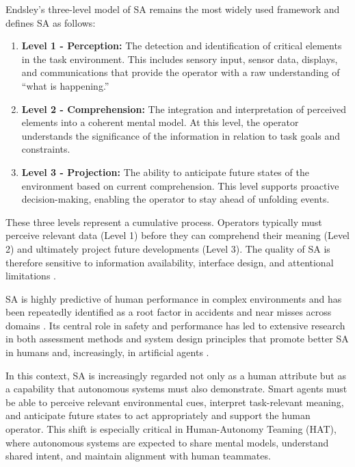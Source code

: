 \documentclass[12pt,a4paper]{article} %
\begin{document}
	Endsley's three-level model of SA \parencite{endsley_measurement_1995} remains the most widely used framework and defines SA as follows:
	\begin{enumerate}
		\item \textbf{Level 1 - Perception:} The detection and identification of critical elements in the task environment. This includes sensory input, sensor data, displays, and communications that provide the operator with a raw understanding of “what is happening.”
		
		\item \textbf{Level 2 - Comprehension:} The integration and interpretation of perceived elements into a coherent mental model. At this level, the operator understands the significance of the information in relation to task goals and constraints.
		
		\item \textbf{Level 3 - Projection:} The ability to anticipate future states of the environment based on current comprehension. This level supports proactive decision-making, enabling the operator to stay ahead of unfolding events.
	\end{enumerate}

	These three levels represent a cumulative process. Operators typically must perceive relevant data (Level 1) before they can comprehend their meaning (Level 2) and ultimately project future developments (Level 3). The quality of SA is therefore sensitive to information availability, interface design, and attentional limitations \parencite{endsley-2015}.

	SA is highly predictive of human performance in complex environments and has been repeatedly identified as a root factor in accidents and near misses across domains \parencite{endsley_systematic_2021}. Its central role in safety and performance has led to extensive research in both assessment methods and system design principles that promote better SA in humans and, increasingly, in artificial agents \parencite{kokar_situation_2012}.

	In this context, SA is increasingly regarded not only as a human attribute but as a capability that autonomous systems must also demonstrate. Smart agents must be able to perceive relevant environmental cues, interpret task-relevant meaning, and anticipate future states to act appropriately and support the human operator. This shift is especially critical in Human-Autonomy Teaming (HAT), where autonomous systems are expected to share mental models, understand shared intent, and maintain alignment with human teammates.
\end{document}
